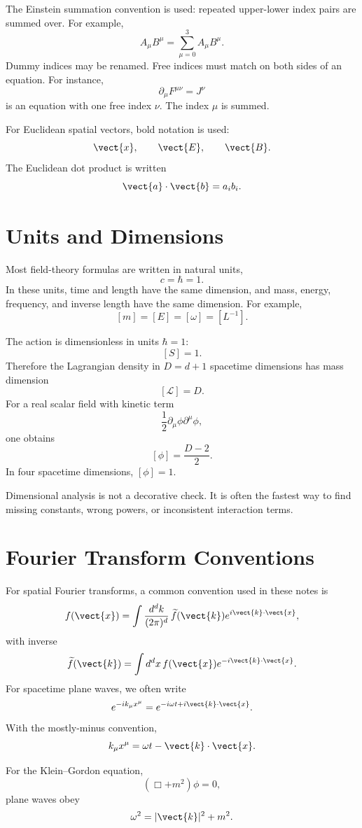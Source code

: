 The Einstein summation convention is used: repeated upper-lower index pairs are
summed over. For example,
\[
    A_\mu B^\mu=\sum_{\mu=0}^3 A_\mu B^\mu.
\]
Dummy indices may be renamed. Free indices must match on both sides of an
equation. For instance,
\[
    \partial_\mu F^{\mu\nu}=J^\nu
\]
is an equation with one free index \(\nu\). The index \(\mu\) is summed.

For Euclidean spatial vectors, bold notation is used:
\[
    \vect{x},\qquad \vect{E},\qquad \vect{B}.
\]
The Euclidean dot product is written
\[
    \vect{a}\cdot\vect{b}=a_i b_i.
\]

\section{Units and Dimensions}

Most field-theory formulas are written in natural units,
\[
    c=\hbar=1.
\]
In these units, time and length have the same dimension, and mass, energy,
frequency, and inverse length have the same dimension. For example,
\[
    [m]=[E]=[\omega]=[L^{-1}].
\]

The action is dimensionless in units \(\hbar=1\):
\[
    [S]=1.
\]
Therefore the Lagrangian density in \(D=d+1\) spacetime dimensions has mass
dimension
\[
    [\mathcal{L}]=D.
\]
For a real scalar field with kinetic term
\[
    \frac{1}{2}\partial_\mu\phi\partial^\mu\phi,
\]
one obtains
\[
    [\phi]=\frac{D-2}{2}.
\]
In four spacetime dimensions, \([\phi]=1\).

Dimensional analysis is not a decorative check. It is often the fastest way to
find missing constants, wrong powers, or inconsistent interaction terms.

\section{Fourier Transform Conventions}

For spatial Fourier transforms, a common convention used in these notes is
\[
    f(\vect{x})=\int\frac{d^d k}{(2\pi)^d}\,\widetilde{f}(\vect{k})
    e^{i\vect{k}\cdot\vect{x}},
\]
with inverse
\[
    \widetilde{f}(\vect{k})=\int d^d x\,f(\vect{x})e^{-i\vect{k}\cdot\vect{x}}.
\]
For spacetime plane waves, we often write
\[
    e^{-ik_\mu x^\mu}=e^{-i\omega t+i\vect{k}\cdot\vect{x}}.
\]
With the mostly-minus convention,
\[
    k_\mu x^\mu=\omega t-\vect{k}\cdot\vect{x}.
\]

For the Klein--Gordon equation,
\[
    (\Box+m^2)\phi=0,
\]
plane waves obey
\[
    \omega^2=|\vect{k}|^2+m^2.
\]

